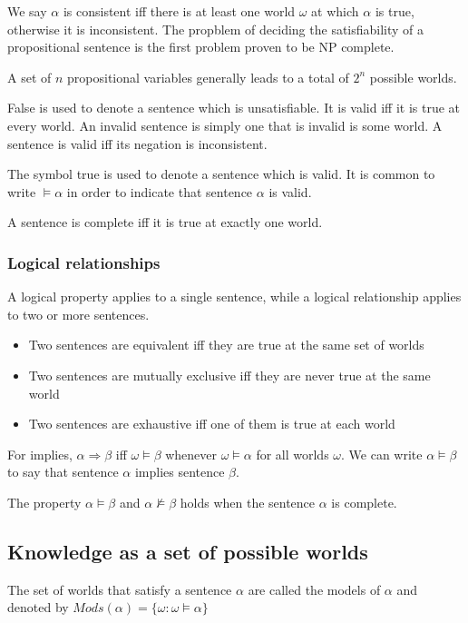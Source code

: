 \documentclass[11pt]{article}
\begin{document}
We say $\alpha$ is consistent iff there is at least one world $\omega$ at which $\alpha$ is true, otherwise it is inconsistent. The propblem of deciding the satisfiability of a propositional sentence is the first problem proven to be NP complete.
\vspace{1em}

A set of $n$ propositional variables generally leads to a total of $2^n$ possible worlds.
\vspace{1em}

False is used to denote a sentence which is unsatisfiable. It is valid iff it is true at every world. An invalid sentence is simply one that is invalid is some world. A sentence is valid iff its negation is inconsistent.
\vspace{1em}

The symbol true is used to denote a sentence which is valid. It is common to write $\models \alpha$ in order to indicate that sentence $\alpha$ is valid.
\vspace{1em}

A sentence is complete iff it is true at exactly one world.

\subsubsection{Logical relationships}
A logical property applies to a single sentence, while a logical relationship applies to two or more sentences.

\begin{itemize}
\item Two sentences are equivalent iff they are true at the same set of worlds
\item Two sentences are mutually exclusive iff they are never true at the same world
\item Two sentences are exhaustive iff one of them is true at each world
\end{itemize}
\vspace{1em}

For implies, $\alpha \Rightarrow \beta$ iff $\omega \models \beta$ whenever $\omega \models \alpha$ for all worlds $\omega$. We can write $\alpha \models \beta$ to say that sentence $\alpha$ implies sentence $\beta$.
\vspace{1em}

The property $\alpha \models \beta$ and $\alpha \not\models \beta$ holds when the sentence $\alpha$ is complete.

\subsection{Knowledge as a set of possible worlds}
The set of worlds that satisfy a sentence $\alpha$ are called the models of $\alpha$ and denoted by $Mods(\alpha) = \{\omega : \omega \models \alpha\}$
\end{document}
